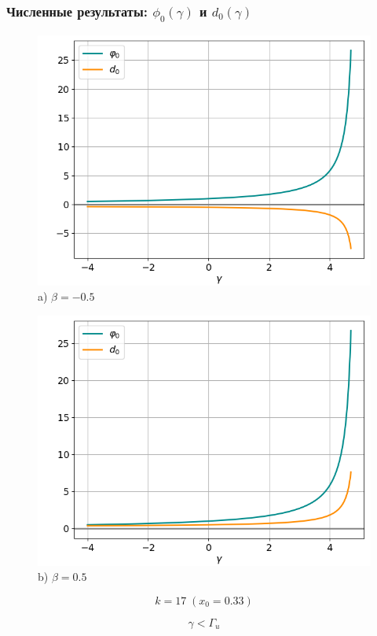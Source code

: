 \documentclass[fullscreen=true, unicode, bookmarks=false]{beamer}
\begin{document}
\begin{frame}
\frametitle{ Численные результаты: $ \phi_0(\gamma) $ и $ d_0(\gamma) $ }

\begin{figure} 
\begin{minipage}[h]{0.49\linewidth}
\begin{center}
\includegraphics[scale=0.34]{divergent_phi0d0_x0=0,33,beta=-0,5.png} \\ {\scriptsize a) $ \beta = -0.5 $}
\end{center}
\end{minipage} 
\hfill
\begin{minipage}[h]{0.49\linewidth}
\begin{center}
\includegraphics[scale=0.34]{divergent_phi0d0_x0=0,33,beta=0,5.png}  \\ {\scriptsize b) $ \beta = 0.5 $}
\end{center}
\end{minipage} 
\end{figure}

$$ k=17 \; (x_0 = 0.33) $$

$$ \gamma < \Gamma_u $$

\end{frame}
\end{document}
